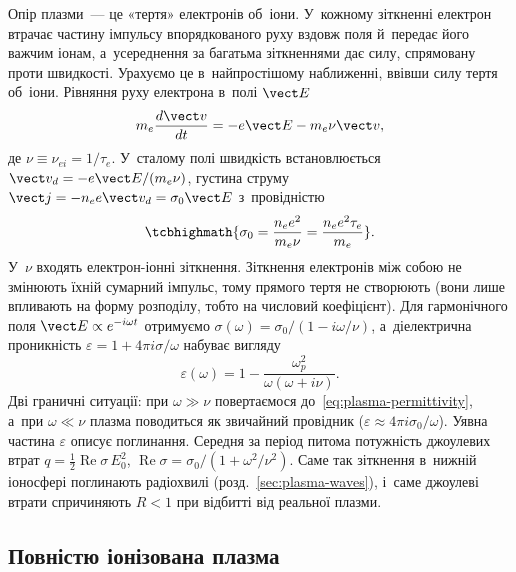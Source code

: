 Опір плазми~--- це «тертя» електронів об~іони. У~кожному зіткненні електрон втрачає частину імпульсу
впорядкованого руху вздовж поля й~передає його важчим іонам, а~усереднення за багатьма зіткненнями
дає силу, спрямовану проти швидкості. Урахуємо це в~найпростішому наближенні, ввівши силу тертя об~іони. Рівняння руху
електрона в~полі $\vect E$
\begin{equation*}
	m_e\frac{d\vect v}{dt}=-e\vect E-m_e\nu\vect v,
\end{equation*}
де $\nu\equiv\nu_{ei}=1/\tau_e$. У~сталому полі швидкість встановлюється $\vect
v_d=-e\vect E/(m_e\nu)$, густина струму $\vect j=-n_ee\vect v_d=\sigma_0\vect E$
з~провідністю
\begin{equation}\label{eq:drude}
	\tcbhighmath{\sigma_0=\frac{n_ee^2}{m_e\nu}=\frac{n_ee^2\tau_e}{m_e}}.
\end{equation}
У~$\nu$ входять електрон-іонні зіткнення. Зіткнення електронів між собою не змінюють їхній
сумарний імпульс, тому прямого тертя не створюють (вони лише впливають на форму розподілу,
тобто на числовий коефіцієнт). Для гармонічного поля $\vect E\propto e^{-i\omega t}$
отримуємо $\sigma(\omega)=\sigma_0/(1-i\omega/\nu)$, а~діелектрична проникність
$\varepsilon=1+4\pi i\sigma/\omega$ набуває вигляду
\begin{equation}\label{eq:eps-collisions}
	\varepsilon(\omega)=1-\frac{\omega_p^2}{\omega(\omega+i\nu)}.
\end{equation}
Дві граничні ситуації: при $\omega\gg\nu$ повертаємося до~\eqref{eq:plasma-permittivity},
а~при $\omega\ll\nu$ плазма поводиться як звичайний провідник ($\varepsilon\approx4\pi
i\sigma_0/\omega$). Уявна частина $\varepsilon$ описує поглинання. Середня за період
питома потужність джоулевих втрат $q=\tfrac12\operatorname{Re}\sigma\,E_0^2$,
$\operatorname{Re}\sigma=\sigma_0/(1+\omega^2/\nu^2)$. Саме так зіткнення в~нижній
іоносфері поглинають радіохвилі (розд.~\ref{sec:plasma-waves}), і~саме джоулеві втрати
спричиняють $R<1$ при відбитті від реальної плазми.



\subsection*{Повністю іонізована плазма}




